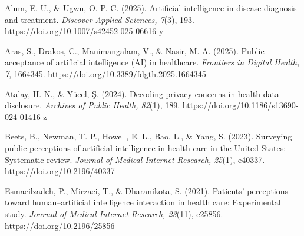 %
\begin{sosareferences}

Alum, E. U., \& Ugwu, O. P.-C. (2025). Artificial intelligence in disease
diagnosis and treatment. \textit{Discover Applied Sciences, 7}(3), 193.
\url{https://doi.org/10.1007/s42452-025-06616-y}

Aras, S., Drakos, C., Manimangalam, V., \& Nasir, M. A. (2025). Public
acceptance of artificial intelligence (AI) in healthcare.
\textit{Frontiers in Digital Health, 7}, 1664345.
\url{https://doi.org/10.3389/fdgth.2025.1664345}

Atalay, H. N., \& Yücel, Ş. (2024). Decoding privacy concerns in health data
disclosure. \textit{Archives of Public Health, 82}(1), 189.
\url{https://doi.org/10.1186/s13690-024-01416-z}

Beets, B., Newman, T. P., Howell, E. L., Bao, L., \& Yang, S. (2023).
Surveying public perceptions of artificial intelligence in health care in the
United States: Systematic review. \textit{Journal of Medical Internet
Research, 25}(1), e40337. \url{https://doi.org/10.2196/40337}

Esmaeilzadeh, P., Mirzaei, T., \& Dharanikota, S. (2021). Patients' perceptions
toward human--artificial intelligence interaction in health care: Experimental
study. \textit{Journal of Medical Internet Research, 23}(11), e25856.
\url{https://doi.org/10.2196/25856}

\end{sosareferences}
